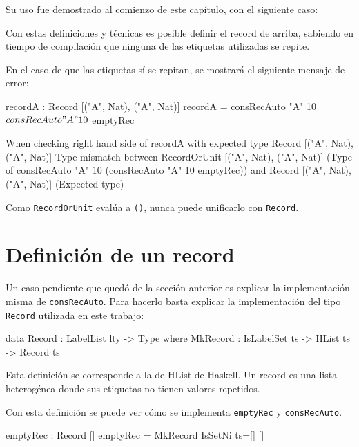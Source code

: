 Su uso fue demostrado al comienzo de este capítulo, con el siguiente caso:


Con estas definiciones y técnicas es posible definir el record de arriba, sabiendo en tiempo de compilación que ninguna de las etiquetas utilizadas se repite.

En el caso de que las etiquetas sí se repitan, se mostrará el siguiente mensaje de error:

\begin{code}
recordA : Record [("A", Nat), ("A", Nat)]
recordA = consRecAuto "A" 10 $
  consRecAuto "A" 10 $
  emptyRec

When checking right hand side of recordA with expected type
    Record [("A", Nat), ("A", Nat)]
  Type mismatch between
    RecordOrUnit [("A", Nat), ("A", Nat)]
      (Type of consRecAuto "A" 10
        (consRecAuto "A" 10 emptyRec))
  and
    Record [("A", Nat), ("A", Nat)] (Expected type)
\end{code}

Como \texttt{RecordOrUnit} evalúa a \texttt{()}, nunca puede unificarlo con \texttt{Record}.

\section{Definición de un record}

Un caso pendiente que quedó de la sección anterior es explicar la implementación misma de \texttt{consRecAuto}. Para hacerlo basta explicar la implementación del tipo \texttt{Record} utilizada en este trabajo:

\begin{code}
data Record : LabelList lty -> Type where
  MkRecord : IsLabelSet ts -> HList ts -> Record ts
\end{code}

Esta definición se corresponde a la de HList de Haskell. Un record es una lista heterogénea donde sus etiquetas no tienen valores repetidos.

Con esta definición se puede ver cómo se implementa \texttt{emptyRec} y \texttt{consRecAuto}.

\begin{code}
emptyRec : Record []
emptyRec = MkRecord IsSetNi {ts=[]} []
\end{code}

